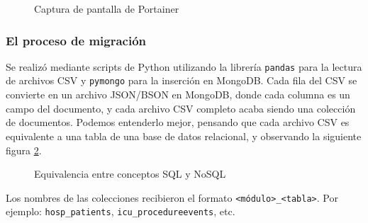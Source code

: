 \begin{figure}[H]
  \centering
  \caption{Captura de pantalla de Portainer}
  \label{fig:screenshot3}
\end{figure}


\subsubsection{El proceso de migración}

Se realizó mediante scripts de Python utilizando la librería \texttt{pandas} para la lectura de archivos CSV y \texttt{pymongo} para la inserción en MongoDB. Cada fila del CSV se convierte en un archivo JSON/BSON \cite{mongojsonbson} en MongoDB, donde cada columna es un campo del documento, y cada archivo CSV completo acaba siendo una colección de documentos. Podemos entenderlo mejor, pensando que cada archivo CSV es equivalente a una tabla de una base de datos relacional, y observando la siguiente figura \ref{fig:equivalenciasql}.

\begin{figure}[H]
  \centering
  \caption{Equivalencia entre conceptos SQL y NoSQL \cite{equisqlfoto}}
  \label{fig:equivalenciasql}
\end{figure}

Los nombres de las colecciones recibieron el formato \texttt{\textless módulo\textgreater\_\textless tabla\textgreater}. Por ejemplo: \texttt{hosp\_patients}, \texttt{icu\_procedureevents}, etc.

